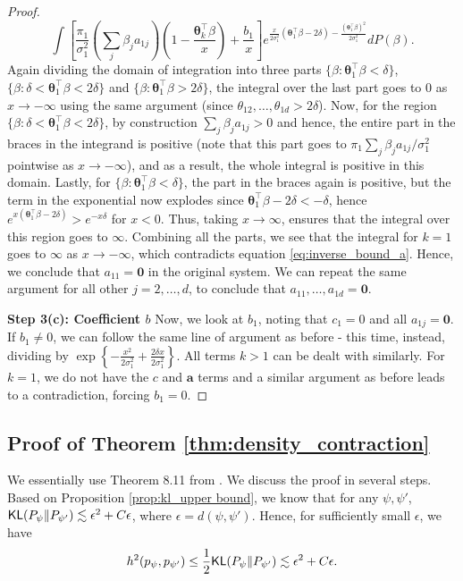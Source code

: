 \documentclass[bj,authoryear]{imsart}
\theoremstyle{plain}
\theoremstyle{remark}
\def\ba{\mathbf{a}}
\def\btheta{{\boldsymbol\theta}}
\def\KL{{\sf KL}}
\begin{document}
\begin{appendix}
\begin{proof}
    $$\int \left[\frac{\pi_1}{\sigma_1^2}\left(\sum_j \beta_j a_{1j}\right)\left(1 - \frac{\btheta_k^\top\beta}{x}\right) + \frac{b_1}{x}\right] e^{\frac{x}{2\sigma_1^2}\left(\btheta_1^\top \beta - 2\delta\right) - \frac{(\btheta_1^\top\beta)^2}{2\sigma_1^2}}dP(\beta).$$
    Again dividing the domain of integration into three parts $\{\beta: \btheta_1^\top\beta < \delta\}$, $\{\beta: \delta < \btheta_1^\top\beta < 2\delta\}$ and $\{\beta: \btheta_1^\top\beta > 2\delta\}$, the integral over the last part goes to 0 as $x\to - \infty$ using the same argument (since $\theta_{12},\dots,\theta_{1d}>2\delta$). Now, for the region $\{\beta: \delta <\btheta_1^\top\beta<2\delta\}$, by construction $\sum_j \beta_ja_{1j}>0$ and hence, the entire part in the braces in the integrand is positive (note that this part goes to $\pi_1\sum_j \beta_ja_{1j}/\sigma_1^2$ pointwise as $x\to-\infty$), and as a result, the whole integral is positive in this domain. Lastly, for $\{\beta: \btheta_1^\top\beta <\delta\}$, the part in the braces again is positive, but the term in the exponential now explodes since $\btheta_1^\top\beta - 2\delta < -\delta$, hence $e^{x(\btheta_1^\top\beta - 2\delta)} > e^{-x\delta}$ for $x<0$. Thus, taking $x\to\infty$, ensures that the integral over this region goes to $\infty$. Combining all the parts, we see that the integral for $k=1$ goes to $\infty$ as $x\to-\infty$, which contradicts equation \eqref{eq:inverse_bound_a}. Hence, we conclude that $a_{11}=\boldsymbol{0}$ in the original system. We can repeat the same argument for all other $j=2,\dots,d$, to conclude that $a_{11},\dots,a_{1d}=\boldsymbol{0}$.

    \vspace{0.5em}
    \textbf{Step 3(c): Coefficient $b$} Now, we look at $b_1$, noting that $c_1=0$ and all $a_{1j}=\boldsymbol{0}$. If $b_1\neq 0$, we can follow the same line of argument as before - this time, instead, dividing by $\exp\left\{-\frac{x^2}{2\sigma_1^2} + \frac{2\delta x}{2\sigma_1^2}\right\}$. All terms $k>1$ can be dealt with similarly. For $k=1$, we do not have the $c$ and $\ba$ terms and a similar argument as before leads to a contradiction, forcing $b_1=0$.
\end{proof}

\subsection{Proof of Theorem \ref{thm:density_contraction}}\label{app:proof_contraction_rate}
We essentially use Theorem 8.11 from \cite{ghosal2017fundamentals}. We discuss the proof in several steps. Based on Proposition \ref{prop:kl_upper bound}, we know that for any $\psi, \psi'$, $\KL(P_{\psi}\Vert P_{\psi'}) \lesssim \epsilon^2 + C \epsilon$, where $\epsilon=d(\psi,\psi')$. Hence, for sufficiently small $\epsilon$, we have
\begin{equation}\label{eq:hellinger_bound_d}
h^2(p_{\psi}, p_{\psi'}) \leq \frac{1}{2}\KL(P_{\psi}\Vert P_{\psi'}) \lesssim \epsilon^2+C\epsilon.
\end{equation}


\end{appendix}
\end{document}
